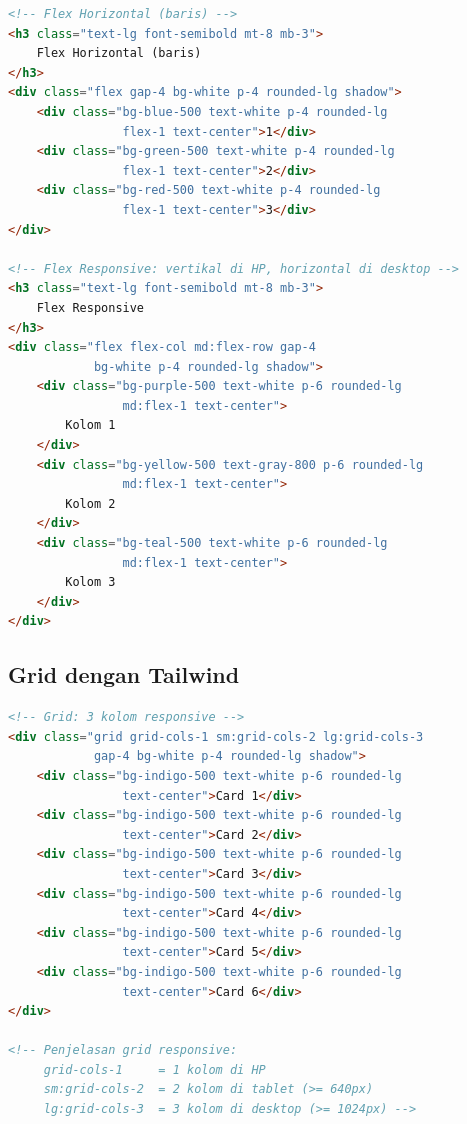 \begin{lstlisting}[language=HTML, caption={Flexbox: horizontal dan responsive}, label={lst:12-flexbox}]
<!-- Flex Horizontal (baris) -->
<h3 class="text-lg font-semibold mt-8 mb-3">
    Flex Horizontal (baris)
</h3>
<div class="flex gap-4 bg-white p-4 rounded-lg shadow">
    <div class="bg-blue-500 text-white p-4 rounded-lg
                flex-1 text-center">1</div>
    <div class="bg-green-500 text-white p-4 rounded-lg
                flex-1 text-center">2</div>
    <div class="bg-red-500 text-white p-4 rounded-lg
                flex-1 text-center">3</div>
</div>

<!-- Flex Responsive: vertikal di HP, horizontal di desktop -->
<h3 class="text-lg font-semibold mt-8 mb-3">
    Flex Responsive
</h3>
<div class="flex flex-col md:flex-row gap-4
            bg-white p-4 rounded-lg shadow">
    <div class="bg-purple-500 text-white p-6 rounded-lg
                md:flex-1 text-center">
        Kolom 1
    </div>
    <div class="bg-yellow-500 text-gray-800 p-6 rounded-lg
                md:flex-1 text-center">
        Kolom 2
    </div>
    <div class="bg-teal-500 text-white p-6 rounded-lg
                md:flex-1 text-center">
        Kolom 3
    </div>
</div>
\end{lstlisting}

\subsection{Grid dengan Tailwind}

\begin{lstlisting}[language=HTML, caption={Grid: 3 kolom responsive}, label={lst:12-grid}]
<!-- Grid: 3 kolom responsive -->
<div class="grid grid-cols-1 sm:grid-cols-2 lg:grid-cols-3
            gap-4 bg-white p-4 rounded-lg shadow">
    <div class="bg-indigo-500 text-white p-6 rounded-lg
                text-center">Card 1</div>
    <div class="bg-indigo-500 text-white p-6 rounded-lg
                text-center">Card 2</div>
    <div class="bg-indigo-500 text-white p-6 rounded-lg
                text-center">Card 3</div>
    <div class="bg-indigo-500 text-white p-6 rounded-lg
                text-center">Card 4</div>
    <div class="bg-indigo-500 text-white p-6 rounded-lg
                text-center">Card 5</div>
    <div class="bg-indigo-500 text-white p-6 rounded-lg
                text-center">Card 6</div>
</div>

<!-- Penjelasan grid responsive:
     grid-cols-1     = 1 kolom di HP
     sm:grid-cols-2  = 2 kolom di tablet (>= 640px)
     lg:grid-cols-3  = 3 kolom di desktop (>= 1024px) -->
\end{lstlisting}

